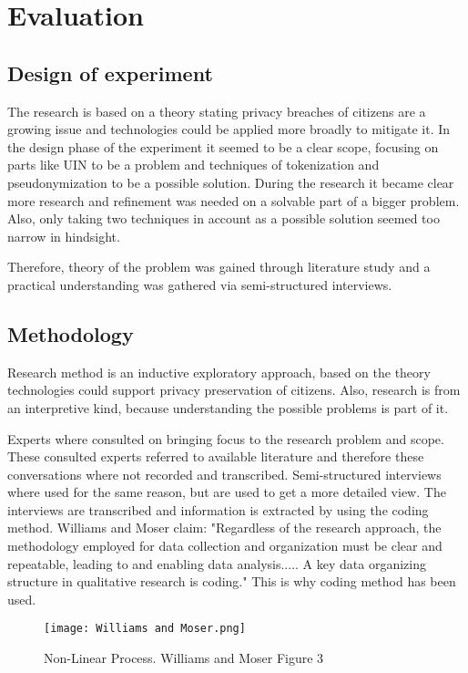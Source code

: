 \chapter{Evaluation}\label{s:evaluation}

\section{Design of experiment}
The research is based on a theory stating privacy breaches of citizens are a growing issue and technologies could be applied more broadly to mitigate it. In the design phase of the experiment it seemed to be a clear scope, focusing on parts like UIN to be a problem and techniques of tokenization and pseudonymization to be a possible solution. During the research it became clear more research and refinement was needed on a solvable part of a bigger problem. Also, only taking two techniques in account as a possible solution seemed too narrow in hindsight.

Therefore, theory of the problem was gained through literature study and a practical understanding was gathered via semi-structured interviews.

\section{Methodology}
Research method is an inductive exploratory approach, based on the theory technologies could support privacy preservation of citizens. Also, research is from an interpretive kind, because understanding the possible problems is part of it.

Experts where consulted on bringing focus to the research problem and scope. These consulted experts referred to available literature and therefore these conversations where not recorded and transcribed. 
Semi-structured interviews where used for the same reason, but are used to get a more detailed view. The interviews are transcribed and information is extracted by using the coding method.  Williams and Moser \cite{Williams2019TheAO} claim: "Regardless of the research approach, the methodology employed for data collection and
organization must be clear and repeatable, leading to and enabling data analysis..... A key data organizing structure in qualitative research is coding." This is why coding method has been used. 

\graphicspath{ {./images/} }
\begin{figure}
\centering
\label{fig:WM2019}
\texttt{[image: Williams and Moser.png]}\\
\caption{Non-Linear Process. Williams and Moser \cite{Williams2019TheAO} Figure 3}
\end{figure}

